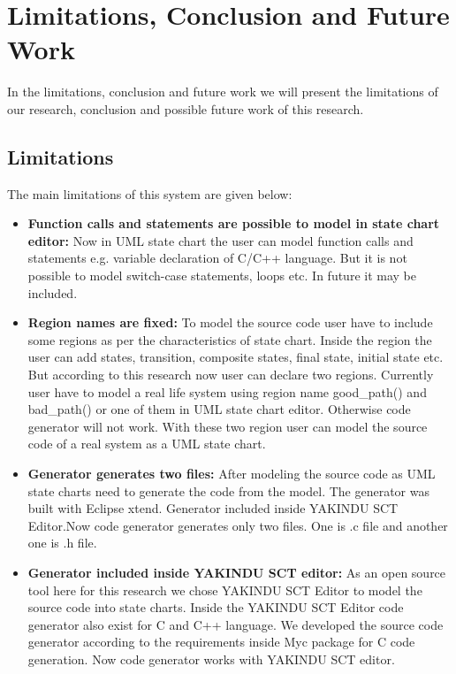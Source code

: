 \chapter{Limitations, Conclusion and Future Work}

In the limitations, conclusion and future work we will present the limitations of our research, conclusion and possible future work of this research.


\section{Limitations}
The main limitations of this system are given below:
\begin{itemize}
	\item \textbf{Function calls and statements are possible to model in state chart editor:} Now in UML state chart the user can model function calls and statements e.g. variable declaration of C/C++ language. But it is not possible to model switch-case statements, loops etc. In future it may be included.
	
	\item \textbf{Region names are fixed:} To model the source code user have to include some regions as per the characteristics of state chart. Inside the region the user can add states, transition, composite states, final state, initial state etc. But according to this research now user can declare two regions. Currently user have to model a real life system using region name good\_path() and bad\_path() or one of them in UML state chart editor. Otherwise code generator will not work. With these two region user can model the source code of a real system as a UML state chart. 
	
	\item \textbf{Generator generates two files:} After modeling the source code as UML state charts need to generate the code from the model. The generator was built with Eclipse xtend. Generator included inside YAKINDU SCT Editor.Now code generator generates only two files. One is .c file and another one is .h file.
	
	\item \textbf{Generator included inside YAKINDU SCT editor:} As an open source tool here for this research we chose YAKINDU SCT Editor to model the source code into state charts. Inside the YAKINDU SCT Editor code generator also exist for C and C++ language. We developed the source code generator according to the requirements inside Myc package for C code generation. Now code generator works with YAKINDU SCT editor.
	

\end{itemize}
